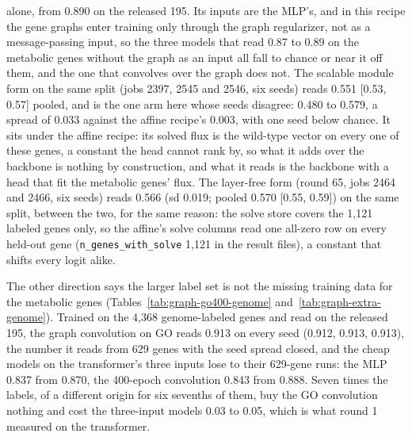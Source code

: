 alone,
from 0.890 on the released 195. Its inputs are the MLP's, and in this recipe the gene
graphs enter training only through the graph regularizer, not as a message-passing
input, so the three models that read 0.87 to 0.89 on the metabolic genes without the
graph as an input all fall to chance or near it off them, and the one that convolves
over the graph does not. The scalable module form on the same split (jobs 2397, 2545 and 2546, six
seeds) reads 0.551 [0.53, 0.57] pooled, and is the one arm here whose seeds disagree:
0.480 to 0.579, a spread of 0.033 against the affine recipe's 0.003, with one seed
below chance. It sits under the affine recipe: its solved flux is the wild-type vector on every one of these genes, a
constant the head cannot rank by, so what it adds over the backbone is nothing by
construction, and what it reads is the backbone with a head that fit the metabolic
genes' flux. The layer-free form (round 65, jobs 2464 and 2466, six seeds) reads
0.566 (sd 0.019; pooled 0.570 [0.55, 0.59]) on the same split, between the two, for
the same reason: the solve store covers the 1,121 labeled genes only, so the affine's solve columns read one all-zero row on every held-out gene (\texttt{n\_genes\_with\_solve} 1,121 in the result files), a constant that shifts every logit alike.

The other direction says the larger label set is not the missing training data for
the metabolic genes (Tables~\ref{tab:graph-go400-genome}
and~\ref{tab:graph-extra-genome}). Trained on the 4,368 genome-labeled genes and read
on the released 195, the graph convolution on GO reads 0.913 on every seed (0.912,
0.913, 0.913), the number it reads from 629 genes with the seed spread closed, and the
cheap models on the transformer's three inputs lose to their 629-gene runs: the MLP
0.837 from 0.870, the 400-epoch convolution 0.843 from 0.888. Seven times the labels,
of a different origin for six sevenths of them, buy the GO convolution nothing and
cost the three-input models 0.03 to 0.05, which is what round 1 measured on the
transformer.




